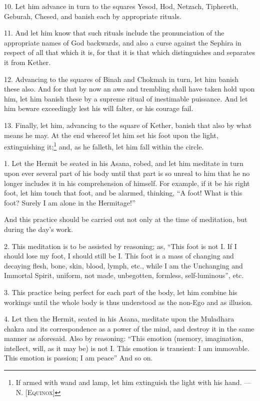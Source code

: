 10. Let him advance in turn to the squares Yesod, Hod, Netzach, Tiphereth, Geburah, Chesed, and banish each by appropriate rituals.

11. And let him know that such rituals include the pronunciation of the appropriate names of God backwards, and also a curse against the Sephira in respect of all that which it is, for that it is that which distinguishes and separates it from Kether.

12. Advancing to the squares of Binah and Chokmah in turn, let him banish these also. And for that by now an awe and trembling shall have taken hold upon him, let him banish these by a supreme ritual of inestimable puissance. And let him beware exceedingly lest his will falter, or his courage fail.

13. Finally, let him, advancing to the square of Kether, banish that also by what means he may. At the end whereof let him set his foot upon the light, extinguishing it;\footnote{If armed with wand and lamp, let him extinguish the light with his hand. --- N. \textsc{[Equinox]}} and, as he falleth, let him fall within the circle.


1. Let the Hermit be seated in his Asana, robed, and let him meditate in turn upon ever several part of his body until that part is so unreal to him that he no longer includes it in his comprehension of himself. For example, if it be his right foot, let him touch that foot, and be alarmed, thinking, \enquote{A foot! What is this foot? Surely I am alone in the Hermitage!}

And this practice should be carried out not only at the time of meditation, but during the day's work.

2. This meditation is to be assisted by reasoning; as, \enquote{This foot is not I. If I should lose my foot, I should still be I. This foot is a mass of changing and decaying flesh, bone, skin, blood, lymph, etc., while I am the Unchanging and Immortal Spirit, uniform, not made, unbegotten, formless, self-luminous}, etc.

3. This practice being perfect for each part of the body, let him combine his workings until the whole body is thus understood as the non-Ego and as illusion.

4. Let then the Hermit, seated in his Asana, meditate upon the Muladhara chakra and its correspondence as a power of the mind, and destroy it in the same manner as aforesaid. Also by reasoning: \enquote{This emotion (memory, imagination, intellect, will, as it may be) is not I. This emotion is transient: I am immovable. This emotion is passion; I am peace} And so on.

